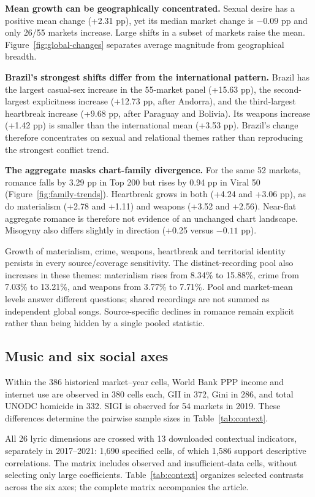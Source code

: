 \documentclass[10pt,a4paper,twocolumn]{article}
\begin{document}
\textbf{Mean growth can be geographically concentrated.} Sexual desire has a positive mean change (+2.31 pp), yet its median market change is $-0.09$ pp and only 26/55 markets increase. Large shifts in a subset of markets raise the mean. Figure~\ref{fig:global-changes} separates average magnitude from geographical breadth.

\textbf{Brazil's strongest shifts differ from the international pattern.} Brazil has the largest casual-sex increase in the 55-market panel (+15.63 pp), the second-largest explicitness increase (+12.73 pp, after Andorra), and the third-largest heartbreak increase (+9.68 pp, after Paraguay and Bolivia). Its weapons increase (+1.42 pp) is smaller than the international mean (+3.53 pp). Brazil's change therefore concentrates on sexual and relational themes rather than reproducing the strongest conflict trend.

\textbf{The aggregate masks chart-family divergence.} For the same 52 markets, romance falls by 3.29 pp in Top 200 but rises by 0.94 pp in Viral 50 (Figure~\ref{fig:family-trends}). Heartbreak grows in both (+4.24 and +3.06 pp), as do materialism (+2.78 and +1.11) and weapons (+3.52 and +2.56). Near-flat aggregate romance is therefore not evidence of an unchanged chart landscape. Misogyny also differs slightly in direction (+0.25 versus $-0.11$ pp).

Growth of materialism, crime, weapons, heartbreak and territorial identity persists in every source/coverage sensitivity. The distinct-recording pool also increases in these themes: materialism rises from 8.34\% to 15.88\%, crime from 7.03\% to 13.21\%, and weapons from 3.77\% to 7.71\%. Pool and market-mean levels answer different questions; shared recordings are not summed as independent global songs. Source-specific declines in romance remain explicit rather than being hidden by a single pooled statistic.

\subsection{Music and six social axes}
Within the 386 historical market--year cells, World Bank PPP income and internet use are observed in 380 cells each, GII in 372, Gini in 286, and total UNODC homicide in 332. SIGI is observed for 54 markets in 2019. These differences determine the pairwise sample sizes in Table~\ref{tab:context}.

All 26 lyric dimensions are crossed with 13 downloaded contextual indicators, separately in 2017--2021: 1,690 specified cells, of which 1,586 support descriptive correlations. The matrix includes observed and insufficient-data cells, without selecting only large coefficients. Table~\ref{tab:context} organizes selected contrasts across the six axes; the complete matrix accompanies the article.
\end{document}
